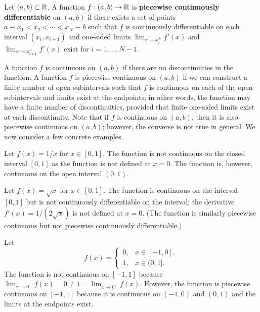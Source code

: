 \begin{definition}
    Let $(a, b) \subset \mathbb{R}$. A function $f : (a, b) \to \mathbb{R}$ is \textbf{piecewise continuously differentiable} on $(a, b)$ if there exists a set of points $a \equiv x_1 < x_2 < \cdots < x_N \equiv b$ such that $f$ is continuously differentiable on each interval $(x_i, x_{i+1})$ and one-sided limits $\lim_{x \to x_i^+} f'(x)$ and $\lim_{x \to x_{i+1}^-} f'(x)$ exist for $i = 1, \dots, N - 1$.
\end{definition}

A function $f$ is continuous on $(a, b)$ if there are no discontinuities in the function. A function $f$ is piecewise continuous on $(a, b)$ if we can construct a finite number of open subintervals such that $f$ is continuous on each of the open subintervals and limits exist at the endpoints; in other words, the function may have a finite number of discontinuities, provided that finite one-sided limits exist at each discontinuity. Note that if $f$ is continuous on $(a, b)$, then it is also piecewise continuous on $(a, b)$; however, the converse is not true in general. We now consider a few concrete examples.

\begin{example}
    Let $f(x) = 1/x$ for $x \in [0, 1]$. The function is not continuous on the closed interval $[0, 1]$ as the function is not defined at $x = 0$. The function is, however, continuous on the open interval $(0, 1)$.
\end{example}

\begin{example}
    Let $f(x) = \sqrt{x}$ for $x \in [0, 1]$. The function is continuous on the interval $[0, 1]$ but is not continuously differentiable on the interval; the derivative $f'(x) = 1/(2\sqrt{x})$ is not defined at $x = 0$. (The function is similarly piecewise continuous but not piecewise continuously differentiable.)
\end{example}

\begin{example}
    Let
    \[f(x) = \begin{cases} 0, & x \in [-1, 0], \\ 1, & x \in (0, 1]. \end{cases}\]
    The function is not continuous on $[-1, 1]$ because $\lim_{x \to 0^-} f(x) = 0 \neq 1 = \lim_{x \to 0^+} f(x)$. However, the function is piecewise continuous on $[-1, 1]$ because it is continuous on $(-1, 0)$ and $(0, 1)$ and the limits at the endpoints exist.
\end{example}

